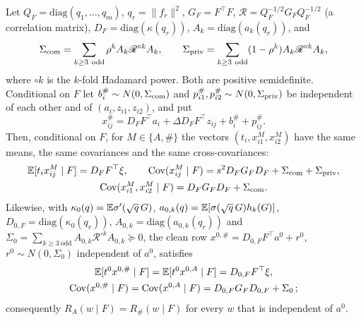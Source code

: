 \begin{proposition}\label{prop:gaussianization}
Let $Q_F=\mathrm{diag}(q_1,\dots,q_m)$, $q_r=\|f_r\|^2$, $G_F=F^\top F$, $\mathscr R=Q_F^{-1/2}G_FQ_F^{-1/2}$ (a
correlation matrix), $D_F=\mathrm{diag}(\kappa(q_r))$, $A_k=\mathrm{diag}(a_k(q_r))$, and
\[
\Sigma_{\rm com}=\sum_{k\ge3\ \mathrm{odd}}\rho^kA_k\mathscr R^{\circ k}A_k,\qquad
\Sigma_{\rm priv}=\sum_{k\ge3\ \mathrm{odd}}(1-\rho^k)A_k\mathscr R^{\circ k}A_k,
\]
where $\circ k$ is the $k$-fold Hadamard power. Both are positive semidefinite. Conditional on $F$ let
$b_i^\#\sim N(0,\Sigma_{\rm com})$ and $p_{i1}^\#,p_{i2}^\#\sim N(0,\Sigma_{\rm priv})$ be independent of each other
and of $(a_i,z_{i1},z_{i2})$, and put
\begin{equation}
x^\#_{ij}=D_FF^\top a_i+\Delta D_FF^\top z_{ij}+b_i^\#+p^\#_{ij}.
\label{eq:sharp}
\end{equation}
Then, conditional on $F$, for $M\in\{A,\#\}$ the vectors $(t_i,x^M_{i1},x^M_{i2})$ have the same means, the same
covariances and the same cross-covariances:
\begin{equation}
\begin{gathered}
\mathbb{E}[t_ix^M_{ij}\mid F]=D_FF^\top\xi,\qquad
\mathrm{Cov}(x^M_{ij}\mid F)=s^2D_FG_FD_F+\Sigma_{\rm com}+\Sigma_{\rm priv},\\
\mathrm{Cov}(x^M_{i1},x^M_{i2}\mid F)=D_FG_FD_F+\Sigma_{\rm com}.
\end{gathered}
\label{eq:matching}
\end{equation}
Likewise, with $\kappa_0(q)=\mathbb{E}\sigma'(\sqrt q\,G)$, $a_{0,k}(q)=\mathbb{E}[\sigma(\sqrt q\,G)h_k(G)]$,
$D_{0,F}=\mathrm{diag}(\kappa_0(q_r))$, $A_{0,k}=\mathrm{diag}(a_{0,k}(q_r))$ and
$\Sigma_{0}=\sum_{k\ge3\ \mathrm{odd}}A_{0,k}\mathscr R^{\circ k}A_{0,k}\succeq0$, the clean row
$x^{0,\#}=D_{0,F}F^\top a^0+r^0$, $r^0\sim N(0,\Sigma_0)$ independent of $a^0$, satisfies
\begin{gather*}
\mathbb{E}[t^0x^{0,\#}\mid F]=\mathbb{E}[t^0x^{0,A}\mid F]=D_{0,F}F^\top\xi,\\
\mathrm{Cov}(x^{0,\#}\mid F)=\mathrm{Cov}(x^{0,A}\mid F)=D_{0,F}G_FD_{0,F}+\Sigma_0\,;
\end{gather*}
consequently $R_A(w\mid F)=R_\#(w\mid F)$ for every $w$ that is independent of $a^0$.
\end{proposition}

